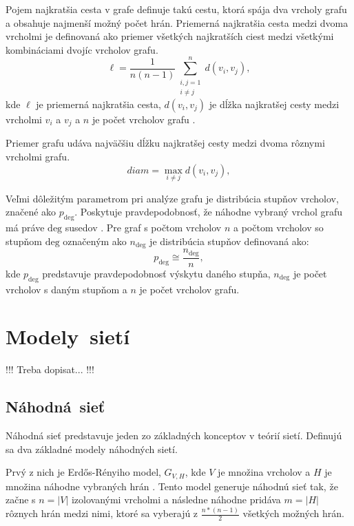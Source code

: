 Pojem najkratšia cesta v grafe definuje takú cestu, ktorá spája dva vrcholy grafu a obsahuje najmenší možný počet
hrán. Priemerná najkratšia cesta medzi dvoma vrcholmi je definovaná ako priemer všetkých najkratších ciest medzi
všetkými kombináciami dvojíc vrcholov grafu.	
\begin{equation}
    \ell = \frac{1}{n(n - 1)} \sum_{\substack{i,j = 1 \\ i \ne j}}^{n} d(v_i, v_j),
    \label{eq:avg_shortest_path}
\end{equation}
kde $\ell$ je priemerná najkratšia cesta, $d(v_i, v_j)$ je dĺžka najkratšej cesty medzi vrcholmi $v_i$ a $v_j$ a $n$ je počet vrcholov grafu \cite{barabasi2016network} .

Priemer grafu udáva najväčšiu dĺžku najkratšej cesty medzi dvoma rôznymi vrcholmi grafu.
\begin{equation}
    diam = \max_{i \ne j} d(v_i, v_j),
    \label{eq:diameter}
\end{equation}

Veľmi dôležitým parametrom pri analýze grafu je distribúcia stupňov vrcholov, značené ako $p_{\mathrm{deg}}$.
Poskytuje pravdepodobnosť, že náhodne vybraný vrchol grafu má práve $\mathrm{deg}$ susedov \cite{barabasi2016network} .
Pre graf s počtom vrcholov $n$ a počtom vrcholov so stupňom $\mathrm{deg}$ označeným ako $n_{\mathrm{deg}}$ je distribúcia stupňov definovaná ako:
\begin{equation}
    p_{\mathrm{deg}} \cong \frac{n_{\mathrm{deg}}}{n},
    \label{eq:degree_distribution}
\end{equation}
kde $p_{\mathrm{deg}}$ predstavuje pravdepodobnosť výskytu daného stupňa, $n_{\mathrm{deg}}$ je počet vrcholov s daným stupňom a $n$ je počet vrcholov grafu.

\section{Modely~sietí}\label{sec:network-models}

!!! Treba dopisat... !!!

\subsection{Náhodná~sieť}\label{sec:random-network}

Náhodná sieť predstavuje jeden zo základných konceptov v teórií sietí. Definujú sa dva základné modely náhodných sietí.

Prvý z nich je Erdős-Rényiho model, $G_{V,H}$, kde $V$ je množina vrcholov a $H$ je množina náhodne vybraných hrán \cite{erdos1959random}\cite{barabasi2016network} .
Tento model generuje náhodnú sieť tak, že začne s $n = |V|$ izolovanými vrcholmi a následne náhodne pridáva $m = |H|$ rôznych hrán medzi nimi,
ktoré sa vyberajú z $\frac{n*(n-1)}{2}$ všetkých možných hrán.

